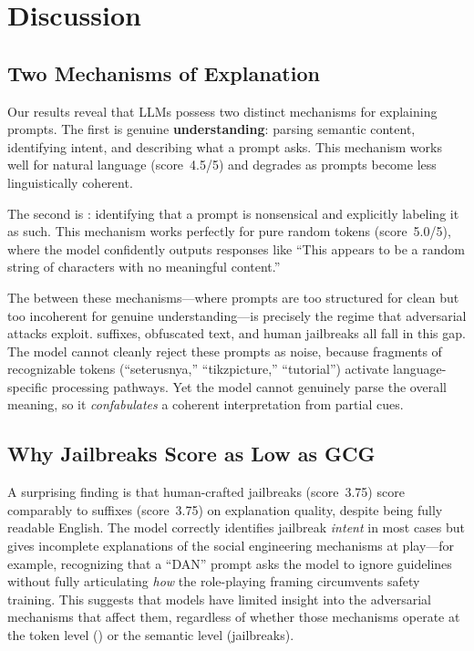 \section{Discussion}
\label{sec:discussion}

\subsection{Two Mechanisms of Explanation}

Our results reveal that LLMs possess two distinct mechanisms for explaining prompts. The first is genuine \textbf{understanding}: parsing semantic content, identifying intent, and describing what a prompt asks. This mechanism works well for natural language (score~4.5/5) and degrades as prompts become less linguistically coherent.

The second is \textbf{\metarecog}: identifying that a prompt is nonsensical and explicitly labeling it as such. This mechanism works perfectly for pure random tokens (score~5.0/5), where the model confidently outputs responses like ``This appears to be a random string of characters with no meaningful content.''

The \uncannyvalley between these mechanisms---where prompts are too structured for clean \metarecog but too incoherent for genuine understanding---is precisely the regime that adversarial attacks exploit. \gcg suffixes, obfuscated text, and human jailbreaks all fall in this gap. The model cannot cleanly reject these prompts as noise, because fragments of recognizable tokens (\eg ``seterusnya,'' ``tikzpicture,'' ``tutorial'') activate language-specific processing pathways. Yet the model cannot genuinely parse the overall meaning, so it \emph{confabulates} a coherent interpretation from partial cues.

\subsection{Why Jailbreaks Score as Low as GCG}

A surprising finding is that human-crafted jailbreaks (score~3.75) score comparably to \gcg suffixes (score~3.75) on explanation quality, despite being fully readable English. The model correctly identifies jailbreak \emph{intent} in most cases but gives incomplete explanations of the social engineering mechanisms at play---for example, recognizing that a ``DAN'' prompt asks the model to ignore guidelines without fully articulating \emph{how} the role-playing framing circumvents safety training. This suggests that models have limited insight into the adversarial mechanisms that affect them, regardless of whether those mechanisms operate at the token level (\gcg) or the semantic level (jailbreaks).

